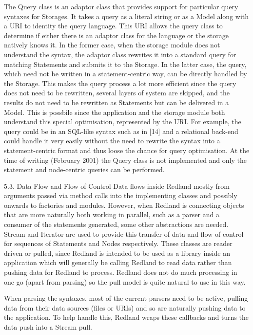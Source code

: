 \documentclass[11pt]{article}
\begin{document}
    The Query class is an adaptor class that provides support for particular query syntaxes for Storages. It takes a query as a literal string or as a Model along with a URI to identity the query language. This URI allows the query class to determine if either there is an adaptor class for the language or the storage natively knows it. In the former case, when the storage module does not understand the syntax, the adaptor class rewrites it into a standard query for matching Statements and submits it to the Storage. In the latter case, the query, which need not be written in a statement-centric way, can be directly handled by the Storage. This makes the query process a lot more efficient since the query does not need to be rewritten, several layers of system are skipped, and the results do not need to be rewritten as Statements but can be delivered in a Model. This is possbile since the application and the storage module both understand this special optimisation, represented by the URI. For example, the query could be in an SQL-like syntax such as in [14] and a relational back-end could handle it very easily without the need to rewrite the syntax into a statement-centric format and thus loose the chance for query optimisation. At the time of writing (February 2001) the Query class is not implemented and only the statement and node-centric queries can be performed.

    5.3. Data Flow and Flow of Control
    Data flows inside Redland mostly from arguments passed via method calls into the implementing classes and possibly onwards to factories and modules. However, when Redland is connecting objects that are more naturally both working in parallel, such as a parser and a consumer of the statements generated, some other abstractions are needed. Stream and Iterator are used to provide this transfer of data and flow of control for sequences of Statements and Nodes respectively. These classes are reader driven or pulled, since Redland is intended to be used as a library inside an application which will generally be calling Redland to read data rather than pushing data for Redland to process. Redland does not do much processing in one go (apart from parsing) so the pull model is quite natural to use in this way.

    When parsing the syntaxes, most of the current parsers need to be active, pulling data from their data sources (files or URIs) and so are naturally pushing data to the application. To help handle this, Redland wraps these callbacks and turns the data push into a Stream pull.
\end{document}
